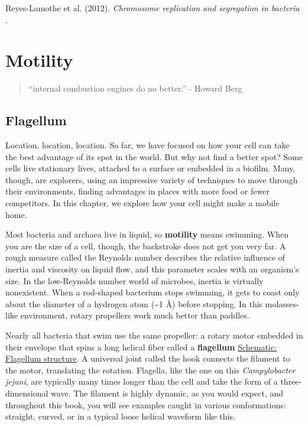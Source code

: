 \documentclass[]{tufte-book}
\begin{document}
Reyes-Lamothe et al. (2012). \emph{Chromosome replication and segregation in bacteria} \citep{reyes-lamothe2012}.

\hypertarget{motility}{%
\chapter{Motility}\label{motility}}

\begin{quote}
``internal combustion engines do no better.''
- Howard Berg \citep{berg1988}
\end{quote}

\hypertarget{flagellum}{%
\section{Flagellum}\label{flagellum}}

Location, location, location. So far, we have focused on how your cell can take the best advantage of its spot in the world. But why not find a better spot? Some cells live stationary lives, attached to a surface or embedded in a biofilm. Many, though, are explorers, using an impressive variety of techniques to move through their environments, finding advantages in places with more food or fewer competitors. In this chapter, we explore how your cell might make a mobile home.

Most bacteria and archaea live in liquid, so \textbf{motility} means swimming. When you are the size of a cell, though, the backstroke does not get you very far. A rough measure called the Reynolds number describes the relative influence of inertia and viscosity on liquid flow, and this parameter scales with an organism's size. In the low-Reynolds number world of microbes, inertia is virtually nonexistent. When a rod-shaped bacterium stops swimming, it gets to coast only about the diameter of a hydrogen atom (\textasciitilde{}1 Å) before stopping. In this molasses-like environment, rotary propellers work much better than paddles.

Nearly all bacteria that swim use the same propeller: a rotary motor embedded in their envelope that spins a long helical fiber called a \textbf{flagellum} \protect\hyperlink{Flagellum_structure}{Schematic: Flagellum structure}. A universal joint called the hook connects the filament to the motor, translating the rotation. Flagella, like the one on this \emph{Campylobacter jejuni}, are typically many times longer than the cell and take the form of a three-dimensional wave. The filament is highly dynamic, as you would expect, and throughout this book, you will see examples caught in various conformations: straight, curved, or in a typical loose helical waveform like this.
\end{document}
